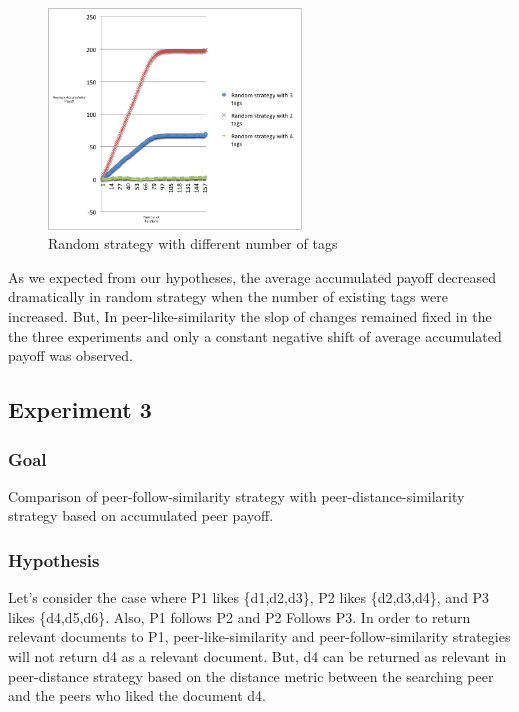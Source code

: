 \documentclass [12pt]{article} \usepackage{multicol}
\begin{document}
\begin{figure}[bp!]
\begin{center}
\includegraphics[width=0.6\textwidth,center]{images/RandTags}
\caption{Random strategy with different number of tags}
\label{fig:images/EXP2-2}
\end{center}
\end{figure}


As we expected from our hypotheses, the average accumulated payoff decreased dramatically in random strategy when the number of existing tags were increased.
But, In peer-like-similarity the slop of changes remained fixed in the the three experiments and only a constant negative shift of average accumulated payoff
was observed. 



\subsection{Experiment 3}

\subsubsection{Goal} Comparison of peer-follow-similarity strategy with peer-distance-similarity strategy based on accumulated peer payoff. 

\subsubsection{Hypothesis}


Let's consider the case where P1 likes \{d1,d2,d3\}, P2 likes
 \{d2,d3,d4\}, and P3 likes  \{d4,d5,d6\}. Also, P1 follows P2 and P2 Follows P3.
 In order to return relevant documents to P1, peer-like-similarity and peer-follow-similarity strategies will not return d4 as a relevant document.
But, d4 can be returned as relevant in peer-distance strategy based on the distance metric between the searching peer and the peers who liked the document d4.
\end{document}

